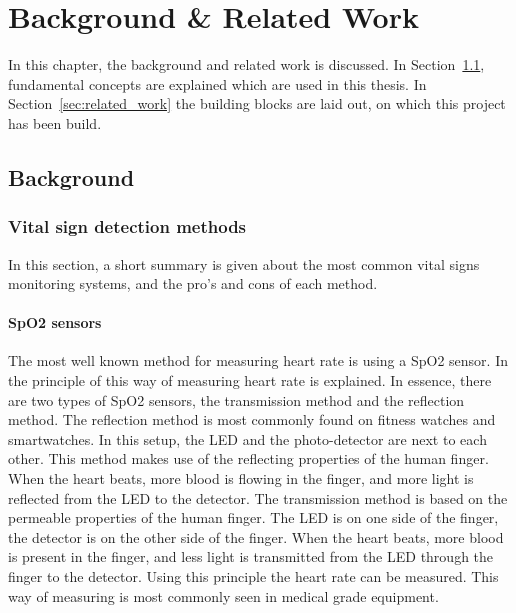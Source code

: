\chapter{Background \& Related Work}
\label{chp:background}

In this chapter, the background and related work is discussed. In Section~\ref{sec:background}, fundamental concepts are explained which are used in this thesis. In Section~\ref{sec:related_work} the building blocks are laid out, on which this project has been build.

\section{Background}
\label{sec:background}
\subsection{Vital sign detection methods}
In this section, a short summary is given about the most common vital signs monitoring systems, and the pro's and cons of each method.

\subsubsection{SpO2 sensors}
The most well known method for measuring heart rate is using a SpO2 sensor. In \cite{sinex1999pulse} the principle of this way of measuring heart rate is explained. In essence, there are two types of SpO2 sensors, the transmission method and the reflection method. The reflection method is most commonly found on fitness watches and smartwatches. In this setup, the LED and the photo-detector are next to each other. This method makes use of the reflecting properties of the human finger. When the heart beats, more blood is flowing in the finger, and more light is reflected from the LED to the detector. The transmission method is based on the permeable properties of the human finger. The LED is on one side of the finger, the detector is on the other side of the finger. When the heart beats, more blood is present in the finger, and less light is transmitted from the LED through the finger to the detector. Using this principle the heart rate can be measured. This way of measuring is most commonly seen in medical grade equipment.

